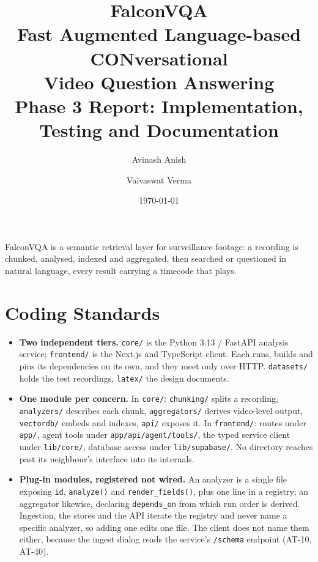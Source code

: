 \documentclass[11pt,a4paper]{article}
\title{\vspace{-1.5em}\textbf{FalconVQA}\\[0.3em]
       \large Fast Augmented Language-based CONversational\\
       Video Question Answering\\[0.4em]
       \normalsize Phase 3 Report: Implementation, Testing and Documentation}
\author{Avinash Anish \and Vaivaswat Verma}
\date{\today}
\begin{document}
\maketitle
\vspace{-2.5em}

\noindent
FalconVQA is a semantic retrieval layer for surveillance footage: a recording is chunked,
analysed, indexed and aggregated, then searched or questioned in natural language, every
result carrying a timecode that plays.

\section{Coding Standards}

\begin{itemize}
  \item \textbf{Two independent tiers.} \texttt{core/} is the Python 3.13 / FastAPI
        analysis service; \texttt{frontend/} is the Next.js and TypeScript client. Each
        runs, builds and pins its dependencies on its own, and they meet only over HTTP.
        \texttt{datasets/} holds the test recordings, \texttt{latex/} the design documents.

  \item \textbf{One module per concern.} In \texttt{core/}: \texttt{chunking/} splits a
        recording, \texttt{analyzers/} describes each chunk, \texttt{aggregators/} derives
        video-level output, \texttt{vectordb/} embeds and indexes, \texttt{api/} exposes
        it. In \texttt{frontend/}: routes under \texttt{app/}, agent tools under
        \texttt{app/api/agent/tools/}, the typed service client under \texttt{lib/core/},
        database access under \texttt{lib/supabase/}. No directory reaches past its
        neighbour's interface into its internals.

  \item \textbf{Plug-in modules, registered not wired.} An analyzer is a single file
        exposing \texttt{id}, \texttt{analyze()} and \texttt{render\_fields()}, plus one
        line in a registry; an aggregator likewise, declaring \texttt{depends\_on} from
        which run order is derived. Ingestion, the stores and the API iterate the registry
        and never name a specific analyzer, so adding one edits one file. The client does
        not name them either, because the ingest dialog reads the service's \texttt{/schema}
        endpoint (AT-10, AT-40).


\end{itemize}
\end{document}
